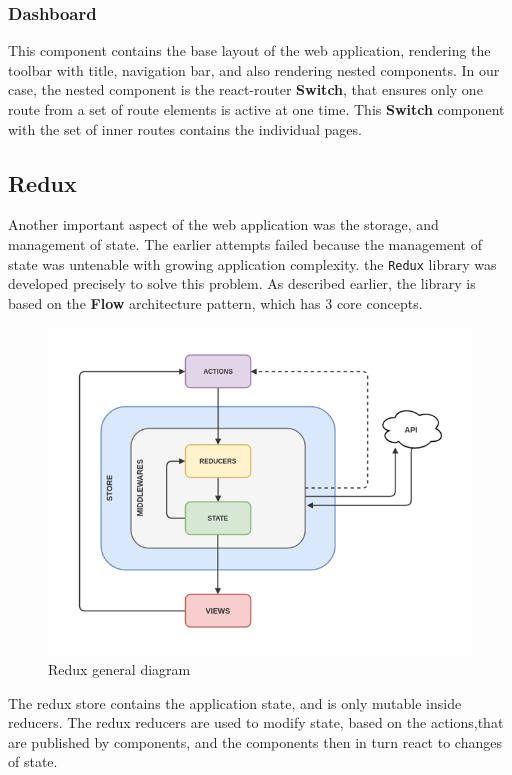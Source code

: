 \subsubsection{Dashboard}
This component contains the base layout of the web application, rendering the toolbar with title, navigation bar,
and also rendering nested components. In our case, the nested component is the react-router \textbf{Switch},
that ensures only one route from a set of route elements is active at one time. This \textbf{Switch} component
with the set of inner routes contains the individual pages.

\subsection{Redux}
Another important aspect of the web application was the storage, and management of state. The earlier attempts failed
because the management of state was untenable with growing application complexity.
the \verb|Redux| library was developed precisely to solve this problem.
As described earlier, the library is based on the \textbf{Flow} architecture pattern, which has 3 core concepts.

\begin{figure}[H]
    \includegraphics[width=\textwidth]{obrazky-figures/redux.png}
    \caption{Redux general diagram}
    \label{img:redux}
\end{figure}


The redux store contains the application state, and is only mutable inside reducers. The redux reducers are used
to modify state, based on the actions,that are published by components, and the components then in turn react to
changes of state.


